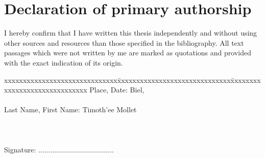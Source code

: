 \chapter*{Declaration of primary authorship}
\label{chap:declaration_authorship}

\vspace*{10mm} 

I hereby confirm that I have written this thesis independently and without using other sources and resources than those specified in the bibliography. All text passages which were not written by me are marked as quotations and provided with the exact indication of its origin. 

\vspace{15mm}

\begin{tabbing}
xxxxxxxxxxxxxxxxxxxxxxxxxxxxxx\=xxxxxxxxxxxxxxxxxxxxxxxxxxxxxx\=xxxxxxxxxxxxxxxxxxxxxxxxxxxxxx\kill
Place, Date:		\>\> Biel, \versiondate \\ \\ 
Last Name, First Name:	\>\> Timoth\a'ee Mollet  \\ \\ \\ \\ 
Signature:	\>\> ......................................\\
\end{tabbing}
